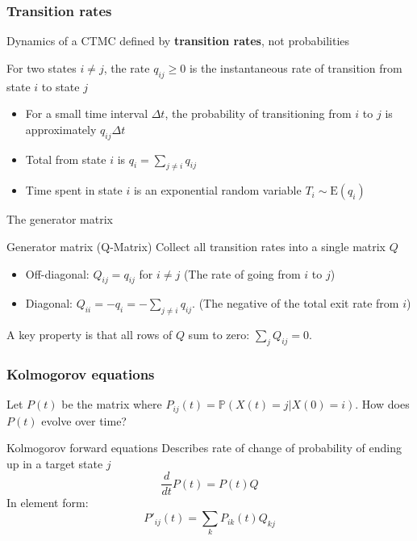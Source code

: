\documentclass[aspectratio=169]{beamer}\usepackage[]{graphicx}\usepackage[]{xcolor}
\begin{document}
\begin{frame}
    \frametitle{Transition rates}
    Dynamics of a CTMC defined by \textbf{transition rates}, not probabilities

    \begin{definition}
        For two states $i \neq j$, the rate $q_{ij} \ge 0$ is the instantaneous rate of transition from state $i$ to state $j$
        \begin{itemize}
            \item For a small time interval $\Delta t$, the probability of transitioning from $i$ to $j$ is approximately $q_{ij} \Delta t$
            \item Total  from state $i$ is $q_i = \sum_{j \neq i} q_{ij}$
            \item Time spent in state $i$ is an exponential random variable $T_i \sim \text{E}(q_i)$
        \end{itemize}
    \end{definition}
\end{frame}
    
\begin{frame}{The generator matrix}
    \begin{block}{Generator matrix (Q-Matrix)}
        Collect all transition rates into a single matrix $Q$
        \begin{itemize}
            \item Off-diagonal: $Q_{ij} = q_{ij}$ for $i \neq j$ (The rate of going from $i$ to $j$)
            \item Diagonal: $Q_{ii} = -q_i = -\sum_{j \neq i} q_{ij}$. (The negative of the total exit rate from $i$)
        \end{itemize}
        A key property is that all rows of $Q$ sum to zero: $\sum_{j} Q_{ij} = 0$.
    \end{block}
    
\end{frame}


\begin{frame}
    \frametitle{Kolmogorov equations}
    Let $P(t)$ be the matrix where $P_{ij}(t) = \mathbb{P}(X(t)=j | X(0)=i)$. How does $P(t)$ evolve over time?
    \vspace{1em}
    
    \begin{alertblock}{Kolmogorov forward equations}
        Describes rate of change of probability of ending up in a target state $j$
        $$ \frac{d}{dt}P(t) = P(t)Q $$
        In element form:
        $$ P'_{ij}(t) = \sum_{k} P_{ik}(t) Q_{kj} $$
    \end{alertblock}
\end{frame}
\end{document}
